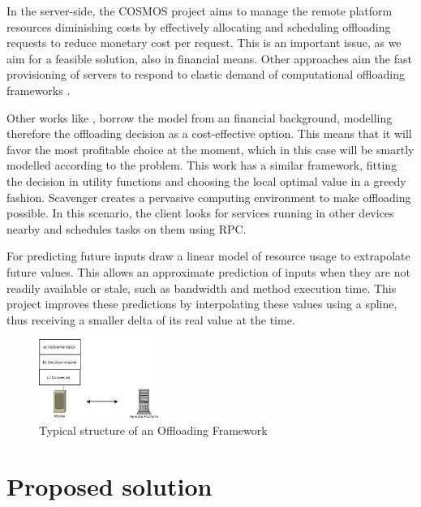 \documentclass[10pt, conference, letterpaper]{IEEEtran}
\begin{document}
  In the server-side, the COSMOS \cite{Shi:2014:CCO:2632951.2632958} project aims to manage the remote platform resources diminishing costs by effectively allocating and scheduling offloading requests to reduce monetary cost per request. This is an important issue, as we aim for a feasible solution, also in financial means. Other approaches aim the fast provisioning of servers to respond to elastic demand of computational offloading frameworks \cite{Ha:2013:JPC:2462456.2464451}.

  Other works like \cite{6162380}, borrow the model from an financial background, modelling therefore the offloading decision as a cost-effective option. This means that it will favor the most profitable choice at the moment, which in this case will be smartly modelled according to the problem. This work has a similar framework, fitting the decision in utility functions and choosing the local optimal value in a greedy fashion. Scavenger \cite{5466972} creates a pervasive computing environment to make offloading possible. In this scenario, the client looks for services running in other devices nearby and schedules tasks on them using RPC.

  For predicting future inputs \cite{Balan:2003:TRE:1066116.1066125} \cite{Cuervo:2010:MMS:1814433.1814441} \cite{kosta2012thinkair} draw a linear model of resource usage to extrapolate future values. This allows an approximate prediction of inputs when they are not readily available or stale, such as bandwidth and method execution time. This project improves these predictions by interpolating these values using a spline, thus receiving a smaller delta of its real value at the time.

\begin{figure}[!t]
  \centering
  \includegraphics[width=0.35\textwidth]{imgs/system.jpeg}
  \caption{Typical structure of an Offloading Framework}
  \label{fig:systemDiagram}
\end{figure}

  \section{Proposed solution} \label{sec:design}
\end{document}
